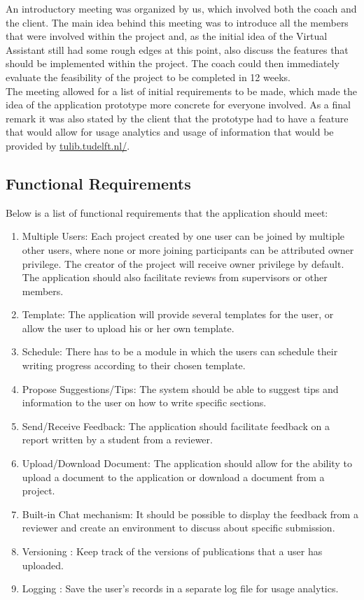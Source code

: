 An introductory meeting was organized by us, which involved both the coach and the client. The main idea behind this meeting was to introduce all the members that were involved within the project and, as the initial idea of the Virtual Assistant still had some rough edges at this point, also discuss the features that should be implemented within the project. The coach could then immediately evaluate the feasibility of the project to be completed in 12 weeks.\\
The meeting allowed for a list of initial requirements to be made, which made the idea of the application prototype more concrete for everyone involved. As a final remark it was also stated by the client that the prototype had to have a feature that would allow for usage analytics and usage of information that would be provided by \url{tulib.tudelft.nl/}.\\ 



\subsection{Functional Requirements} %
\label{sub:functional_requirement}

Below is a list of functional requirements that the application should meet:

\begin{enumerate}
	\item Multiple Users: Each project created by one user can be joined by multiple other users, where none or more joining participants can be attributed owner privilege. The creator of the project will receive owner privilege by default. The application should also facilitate reviews from supervisors or other members.
	\item Template: The application will provide several templates for the user, or allow the user to upload his or her own template.
	\item Schedule: There has to be a module in which the users can schedule their writing progress according to their chosen template.
	\item Propose Suggestions/Tips: The system should be able to suggest tips and information to the user on how to write specific sections.
	\item Send/Receive Feedback: The application should facilitate feedback on a report written by a student from a reviewer.
	
	\item Upload/Download Document: The application should allow for the ability to upload a document to the application or download a document from a project.
	\item Built-in Chat mechanism: It should be possible to display the feedback from a reviewer and create an environment to discuss about specific submission. 
	\item Versioning : Keep track of the versions of publications that a user has uploaded.
	\item Logging : Save the user's records in a separate log file for usage analytics.
\end{enumerate}

